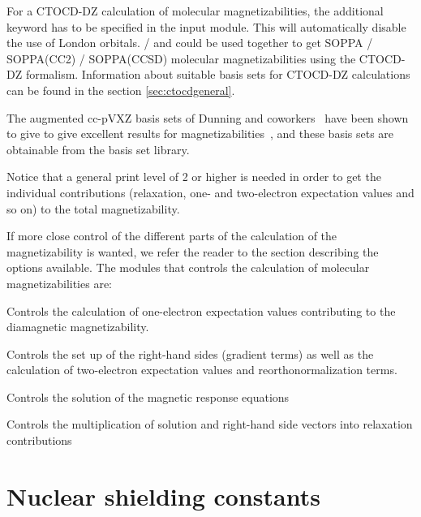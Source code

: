For a CTOCD-DZ calculation of molecular
magnetizabilities, the additional keyword  has to be
specified in the  input module. This will
automatically disable the use of London orbitals.  /
 and  could be used together to get SOPPA /
SOPPA(CC2) / SOPPA(CCSD) molecular magnetizabilities using the CTOCD-DZ
formalism. Information about suitable basis sets for CTOCD-DZ
calculations can be found in the section \ref{sec:ctocdgeneral}.

The augmented cc-pVXZ basis sets of Dunning and
coworkers~\cite{thdjcp90,rakthdrjhjcp96,dewthdjcp98,dewthdjcp100} have
been shown to give  to give excellent results for
magnetizabilities~\cite{krthklbpjhjajjcp99,krthpjklbcpl223,krhsthklbpjjacs116},
and these basis sets are obtainable from the basis set library.

Notice that a general print level of 2 or higher is needed in order to
get the individual contributions (relaxation, one- and
two-electron expectation values and so on) to the total magnetizability.

If more close control of the different parts of the calculation of the
magnetizability is wanted, we refer the reader to the section
describing the options available. The modules that controls the
calculation of molecular magnetizabilities are:

\begin{list}{}{\itemsep 0.10cm \parsep 0.0cm}
\item[\Sec{EXPECT}] Controls the calculation of one-electron
expectation values contributing to the diamagnetic magnetizability.
\item[\Sec{RHSIDE}] Controls the set up of the right-hand sides
(gradient terms) as well as the calculation of two-electron
expectation values and reorthonormalization terms.
\item[\Sec{LINRES}] Controls the solution of the magnetic response
equations
\item[\Sec{RELAX}] Controls the multiplication of solution and right-hand
side vectors into relaxation contributions
\end{list}

\section{Nuclear shielding constants}\label{sec:shieldings}

